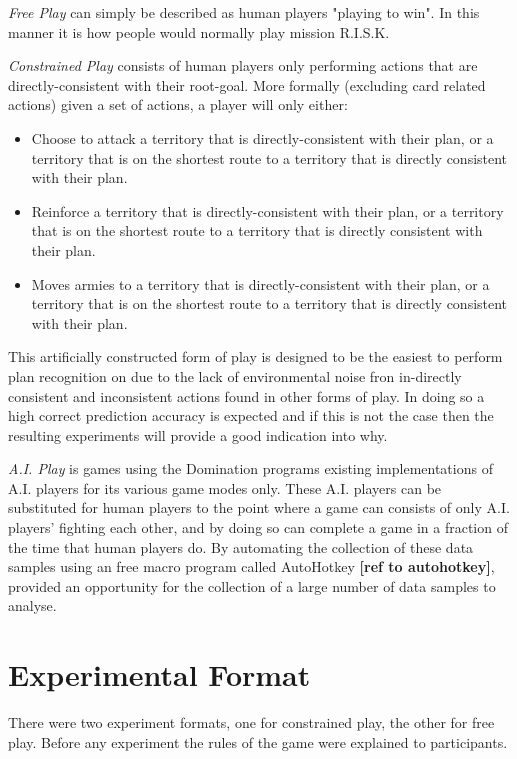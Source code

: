 \documentclass[parskip]{cs4rep}
\begin{document}
\textit{Free Play} can simply be described as human players "playing to win". In this manner it is how people would normally play mission R.I.S.K.

\textit{Constrained Play} consists of human players only performing actions that are directly-consistent with their root-goal.  More formally (excluding card related actions) given a set of actions, a player will only either:

\begin{itemize}
\item
Choose to attack a territory that is directly-consistent with their plan, or a territory that is on the shortest route to a territory that is directly consistent with their plan.
\item
Reinforce a territory that is directly-consistent with their plan, or a territory that is on the shortest route to a territory that is directly consistent with their plan.
\item
Moves armies to a territory that is directly-consistent with their plan, or a territory that is on the shortest route to a territory that is directly consistent with their plan.
\end{itemize}

This artificially constructed form of play is designed to be the easiest to perform plan recognition on due to the lack of environmental noise fron in-directly consistent and inconsistent actions found in other forms of play. In doing so a high correct prediction accuracy is expected and if this is not the case then the resulting experiments will provide a good indication into why.

\textit{A.I. Play} is games using the Domination programs existing implementations of A.I. players for its various game modes only. These A.I. players can be substituted for human players to the point where a game can consists of only A.I. players' fighting each other, and by doing so can complete a game in a fraction of the time that human players do. By automating the collection of these data samples using an free macro program called AutoHotkey \textbf{[ref to autohotkey]}, provided an opportunity for the collection of a large number of data samples to analyse. 

\section{Experimental Format}

There were two experiment formats, one for constrained play, the other for free play. Before any experiment the rules of the game were explained to participants. 
\end{document}
